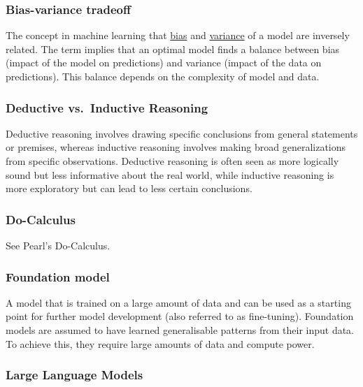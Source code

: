 \hypertarget{bias-variance-tradeoff}{%
\subsubsection{Bias-variance tradeoff}\label{bias-variance-tradeoff}}

The concept in machine learning that \protect\hyperlink{bias-machine-learning}{bias} and \protect\hyperlink{variance-machine-learning}{variance} of a model are inversely related.
The term implies that an optimal model finds a balance between bias (impact of the model on predictions) and variance (impact of the data on predictions).
This balance depends on the complexity of model and data.

\hypertarget{deductive-vs.-inductive-reasoning}{%
\subsubsection{Deductive vs.~Inductive Reasoning}\label{deductive-vs.-inductive-reasoning}}

Deductive reasoning involves drawing specific conclusions from general statements or premises, whereas inductive reasoning involves making broad generalizations from specific observations.
Deductive reasoning is often seen as more logically sound but less informative about the real world, while inductive reasoning is more exploratory but can lead to less certain conclusions.

\hypertarget{do-calculus}{%
\subsubsection{Do-Calculus}\label{do-calculus}}

See Pearl's Do-Calculus.

\hypertarget{foundation-model}{%
\subsubsection{Foundation model}\label{foundation-model}}

A model that is trained on a large amount of data and can be used as a starting point for further model development (also referred to as fine-tuning).
Foundation models are assumed to have learned generalisable patterns from their input data.
To achieve this, they require large amounts of data and compute power.

\hypertarget{large-language-models}{%
\subsubsection{Large Language Models}\label{large-language-models}}

